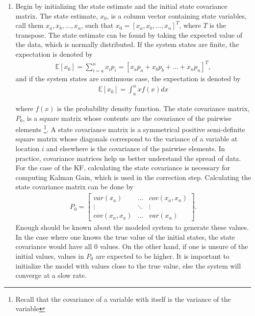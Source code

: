 \begin{enumerate}
  \item Begin by initializing the state estimate and the initial state covariance matrix. The state estimate, $x_0$,  is a  column vector containing state variables, call them $x_a, x_b, \hdots, x_n$, such that $x_0= [x_a, x_b, \hdots, x_n]^T$, where $T$ is the transpose. The state estimate can be found by taking the expected value of the data, which is normally distributed. If the system states are finite, the expectation is denoted by
    \begin{align*}
        \mathbb{E}[x_0]   = \sum^n_{i = a} x_i p_i = [x_a p_a + x_b p_b + \hdots + x_n p_n]^T,
    \end{align*}
    and if the system states are continuous case, the expectation is denoted by 
    \begin{align*}
        \mathbb{E}[x_0]   = \int^n_{a} xf(x)  dx
    \end{align*}
    
    
    where $f(x)$ is the probability density function. The state covariance matrix, $P_0$, is a square matrix whose contents are the covariance of the pairwise elements
    \footnote{Recall that the covariance of a variable with itself is the variance of the variable}.  A state covariance matrix is a symmetrical positive semi-definite square matrix whose diagonals correspond to the variance of a variable at location $i$ and elsewhere is the covariance of the pairwise elements. In practice, covariance matrices help us better understand the spread of data. For the case of the KF, calculating the state covariance is necessary for computing Kalman Gain, which is used in the correction step. Calculating the state covariance matrix can be done by 
    \begin{align*}
      P_0 =
      \begin{bmatrix}
           var(x_a)  & \hdots & cov(x_a,x_n) \\
           \vdots & \ddots & \vdots \\
           cov(x_n, x_a)  & \hdots & var(x_n )
         \end{bmatrix} .
  \end{align*}
  Enough should be known about the modeled system to generate these values. In the case where one knows the true value of the initial states, the state covariance would have all 0 values. On the other hand, if one is unsure of the initial values, values in $P_0$ are expected to be higher. It is important to initialize the model with values close to the true value, else the system will converge at a slow rate.  \\ 
  

\end{enumerate}
